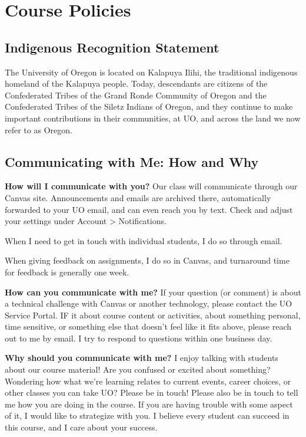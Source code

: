 \documentclass[
  letterpaper,
  DIV=11,
  numbers=noendperiod]{scrartcl}
\begin{document}
\hypertarget{course-policies}{%
\section{Course Policies}\label{course-policies}}

\hypertarget{indigenous-recognition-statement}{%
\subsection{Indigenous Recognition
Statement}\label{indigenous-recognition-statement}}

The University of Oregon is located on Kalapuya Ilihi, the traditional
indigenous homeland of the Kalapuya people. Today, descendants are
citizens of the Confederated Tribes of the Grand Ronde Community of
Oregon and the Confederated Tribes of the Siletz Indians of Oregon, and
they continue to make important contributions in their communities, at
UO, and across the land we now refer to as Oregon.

\hypertarget{communicating-with-me-how-and-why}{%
\subsection{Communicating with Me: How and
Why}\label{communicating-with-me-how-and-why}}

\textbf{How will I communicate with you?} Our class will communicate
through our Canvas site. Announcements and emails are archived there,
automatically forwarded to your UO email, and can even reach you by
text. Check and adjust your settings under Account \textgreater{}
Notifications.

When I need to get in touch with individual students, I do so through
email.

When giving feedback on assignments, I do so in Canvas, and turnaround
time for feedback is generally one week.

\textbf{How can you communicate with me?} If your question (or comment)
is about a technical challenge with Canvas or another technology, please
contact the UO Service Portal. IF it about course content or activities,
about something personal, time sensitive, or something else that doesn't
feel like it fits above, please reach out to me by email. I try to
respond to questions within one business day.

\textbf{Why should you communicate with me?} I enjoy talking with
students about our course material! Are you confused or excited about
something? Wondering how what we're learning relates to current events,
career choices, or other classes you can take UO? Please be in touch!
Please also be in touch to tell me how you are doing in the course. If
you are having trouble with some aspect of it, I would like to
strategize with you. I believe every student can succeed in this course,
and I care about your success.
\end{document}
